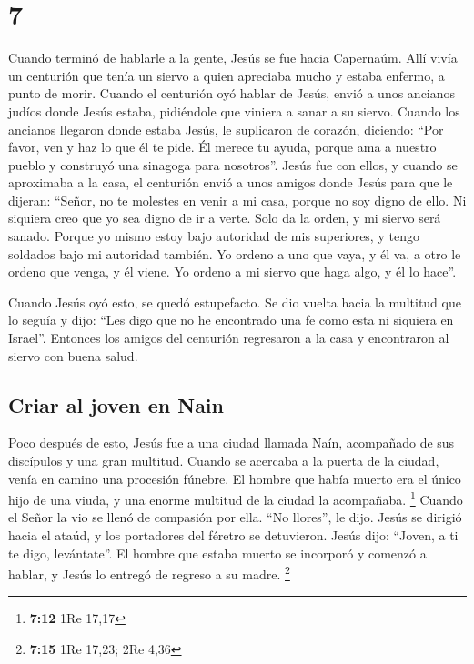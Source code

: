 \hypertarget{section-6}{%
\section{7}\label{section-6}}

 Cuando terminó de hablarle a la gente, Jesús se fue hacia
Capernaúm.  Allí vivía un centurión que tenía un siervo a
quien apreciaba mucho y estaba enfermo, a punto de morir. 
Cuando el centurión oyó hablar de Jesús, envió a unos ancianos judíos
donde Jesús estaba, pidiéndole que viniera a sanar a su siervo.
 Cuando los ancianos llegaron donde estaba Jesús, le
suplicaron de corazón, diciendo: ``Por favor, ven y haz lo que él te
pide. Él merece tu ayuda,  porque ama a nuestro pueblo y
construyó una sinagoga para nosotros''.  Jesús fue con
ellos, y cuando se aproximaba a la casa, el centurión envió a unos
amigos donde Jesús para que le dijeran: ``Señor, no te molestes en venir
a mi casa, porque no soy digno de ello.  Ni siquiera creo
que yo sea digno de ir a verte. Solo da la orden, y mi siervo será
sanado.  Porque yo mismo estoy bajo autoridad de mis
superiores, y tengo soldados bajo mi autoridad también. Yo ordeno a uno
que vaya, y él va, a otro le ordeno que venga, y él viene. Yo ordeno a
mi siervo que haga algo, y él lo hace''.

 Cuando Jesús oyó esto, se quedó estupefacto. Se dio
vuelta hacia la multitud que lo seguía y dijo: ``Les digo que no he
encontrado una fe como esta ni siquiera en Israel''. 
Entonces los amigos del centurión regresaron a la casa y encontraron al
siervo con buena salud.

\hypertarget{criar-al-joven-en-nain}{%
\subsection{Criar al joven en Nain}\label{criar-al-joven-en-nain}}

 Poco después de esto, Jesús fue a una ciudad llamada
Naín, acompañado de sus discípulos y una gran multitud. 
Cuando se acercaba a la puerta de la ciudad, venía en camino una
procesión fúnebre. El hombre que había muerto era el único hijo de una
viuda, y una enorme multitud de la ciudad la acompañaba. \footnote{\textbf{7:12}
  1Re 17,17}  Cuando el Señor la vio se llenó de
compasión por ella. ``No llores'', le dijo.  Jesús se
dirigió hacia el ataúd, y los portadores del féretro se detuvieron.
Jesús dijo: ``Joven, a ti te digo, levántate''.  El
hombre que estaba muerto se incorporó y comenzó a hablar, y Jesús lo
entregó de regreso a su madre. \footnote{\textbf{7:15} 1Re 17,23; 2Re
  4,36}

